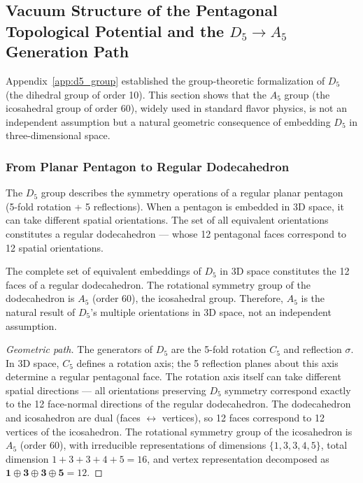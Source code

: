 \subsection{Vacuum Structure of the Pentagonal Topological Potential and the $D_5 \to A_5$ Generation Path}
\label{subsec:d5_a5_path}

Appendix~\ref{app:d5_group} established the group-theoretic formalization of $D_5$ (the dihedral group of order 10). This section shows that the $A_5$ group (the icosahedral group of order 60), widely used in standard flavor physics, is not an independent assumption but a natural geometric consequence of embedding $D_5$ in three-dimensional space.

\subsubsection{From Planar Pentagon to Regular Dodecahedron}

The $D_5$ group describes the symmetry operations of a regular planar pentagon (5-fold rotation + 5 reflections). When a pentagon is embedded in 3D space, it can take different spatial orientations. The set of all equivalent orientations constitutes a regular dodecahedron --- whose 12 pentagonal faces correspond to 12 spatial orientations.

\begin{proposition}
\label{prop:d5_embed_en}
The complete set of equivalent embeddings of $D_5$ in 3D space constitutes the 12 faces of a regular dodecahedron. The rotational symmetry group of the dodecahedron is $A_5$ (order 60), the icosahedral group. Therefore, $A_5$ is the natural result of $D_5$'s multiple orientations in 3D space, not an independent assumption.
\end{proposition}

\begin{proof}[Geometric path]
The generators of $D_5$ are the 5-fold rotation $C_5$ and reflection $\sigma$. In 3D space, $C_5$ defines a rotation axis; the 5 reflection planes about this axis determine a regular pentagonal face. The rotation axis itself can take different spatial directions --- all orientations preserving $D_5$ symmetry correspond exactly to the 12 face-normal directions of the regular dodecahedron. The dodecahedron and icosahedron are dual (faces $\leftrightarrow$ vertices), so 12 faces correspond to 12 vertices of the icosahedron. The rotational symmetry group of the icosahedron is $A_5$ (order 60), with irreducible representations of dimensions $\{1,3,3,4,5\}$, total dimension $1+3+3+4+5=16$, and vertex representation decomposed as $\mathbf{1}\oplus\mathbf{3}\oplus\mathbf{3}\oplus\mathbf{5}=12$.
\end{proof}

